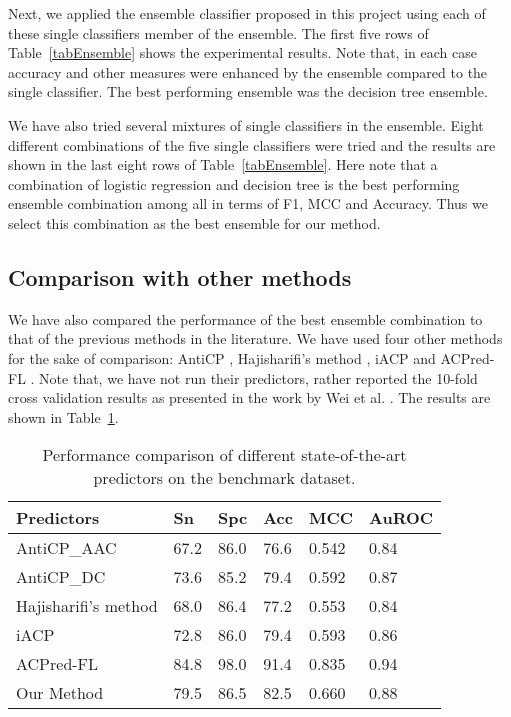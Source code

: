 Next, we applied the ensemble classifier proposed in this project using each of these single classifiers member of the ensemble. The first five rows of Table~\ref{tabEnsemble} shows the experimental results. Note that, in each case accuracy and other measures were enhanced by the ensemble compared to the single classifier. The best performing ensemble was the decision tree ensemble.

We have also tried several mixtures of single classifiers in the ensemble. Eight different combinations of the five single classifiers were tried and the results are shown in the last eight rows of Table~\ref{tabEnsemble}. Here note that a combination of logistic regression and decision tree is the best performing ensemble combination among all in terms of F1, MCC and Accuracy. Thus we select this combination as the best ensemble for our method.

\subsection{Comparison with other methods}
We have also compared the performance of the best ensemble combination to that of the previous methods in the literature. We have used four other methods for the sake of comparison: AntiCP \cite{tyagi2013silico}, Hajisharifi's method \cite{hajisharifi2014predicting}, iACP \cite{chen2016iacp} and ACPred-FL \cite{wei2018acpred}. Note that, we have not run their predictors, rather reported the 10-fold cross validation results as presented in the work by Wei et al. \cite{wei2018acpred}. The results are shown in Table~\ref{tab:Compare}. 


\begin{table}[h]
    \centering
    \begin{tabular}{l| p{1.5cm} p{1.5cm}p{1.5cm}p{1.5cm}p{1.5cm}}
\hline
\bf Predictors	&\bf  Sn &\bf 	Spc &\bf  Acc &\bf MCC&\bf AuROC\\
\hline
AntiCP\_AAC&	67.2&	86.0&	76.6&	0.542&0.84\\%
\hline
AntiCP\_DC&	73.6&	85.2&	79.4&	0.592	&0.87\\%
\hline
Hajisharifi’s method&	68.0&	86.4&	77.2&	0.553&0.84\\%
\hline
iACP&	72.8&	86.0&	79.4&	0.593&0.86\\%
\hline
ACPred-FL& 	84.8&	98.0&	91.4&	0.835	&0.94\\%
\hline
Our Method & 79.5 & 86.5 & 82.5 & 0.660 & 0.88\\
\hline
 \end{tabular}
    \caption{Performance comparison of different state-of-the-art predictors on the benchmark dataset. \label{tab:Compare}}

\end{table}

